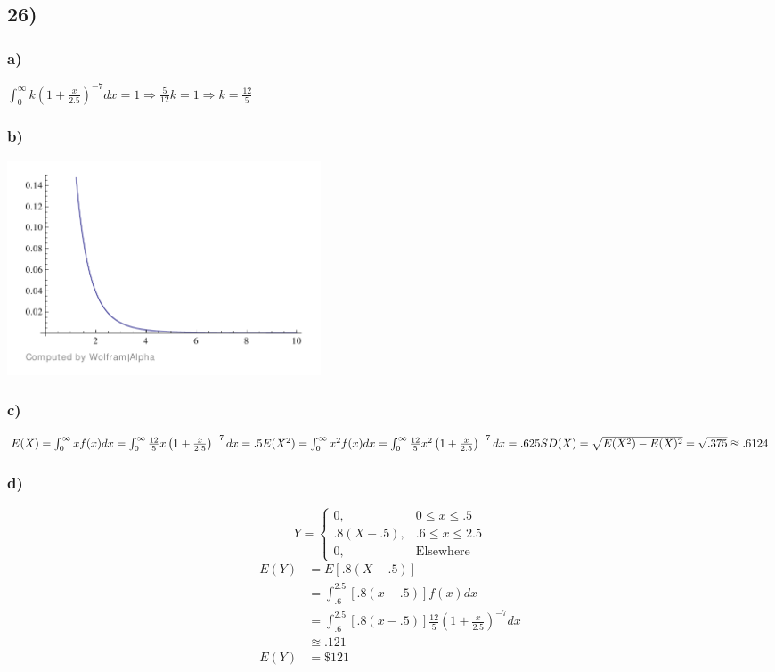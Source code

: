 \documentclass{article}
\begin{document}
	\subsection*{26)}
		\subsubsection*{a)}
			$\int_0^\infty k \left ( 1+ \frac{x}{2.5} \right )^{-7}dx=1 \Rightarrow \frac{5}{12}k=1 \Rightarrow k =\frac{12}{5}$
		\subsubsection*{b)}
			\includegraphics[height=2.5in]{4-2--26b}
		\subsubsection*{c)}
			$E(X) = \int_0^\infty xf(x)dx = \int_0^\infty \frac{12}{5}x \left ( 1 + \frac{x}{2.5} \right )^{-7}dx=.5 \\
			E(X^2) = \int_0^\infty x^2f(x)dx = \int_0^\infty \frac{12}{5}x^2 \left ( 1 + \frac{x}{2.5} \right )^{-7}dx = .625 \\
			SD(X) = \sqrt{E(X^2)-E(X)^2}= \sqrt{.375} \approxeq .6124 $
		\subsubsection*{d)}
			$$
				Y = 
				\begin{cases}
					0, &0 \leq x \leq .5 \\ 
					.8(X-.5), &.6 \leq x \leq 2.5 \\
					0, &\text{Elsewhere}
				\end{cases}
			$$
			\begin{align*}
				E(Y) &= E[.8(X-.5)]\\
				&= \int_{.6}^{2.5} [.8(x-.5)]f(x)dx \\
				&= \int_{.6}^{2.5} [.8(x-.5)] \frac{12}{5} \left (1 + \frac{x}{2.5} \right )^{-7} dx \\
				& \approxeq .121\\
				E(Y) &= \$121
			\end{align*}
\end{document}
